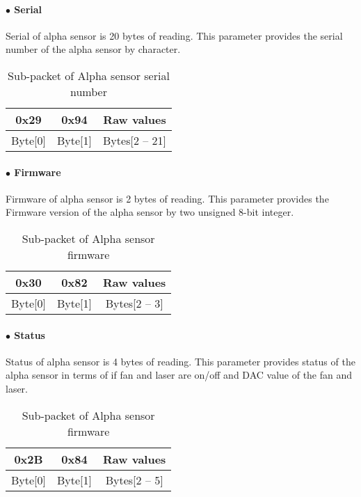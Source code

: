 \paragraph{$\bullet$ Serial}
Serial of alpha sensor is 20 bytes of reading. This parameter provides the serial number of the alpha sensor by character.\\


\begin{table}[h!]
    \centering
    \caption{Sub-packet of Alpha sensor serial number}
    \begin{tabular}{|c|c|c|}
        \hline
        \rowcolor{black!8}
        \textbf{0x29} & \textbf{0x94} & \textbf{Raw values}\\
        \hline
        Byte[0] & Byte[1] & Bytes[2 -- 21] \\ \hline
    \end{tabular}
\end{table}


\paragraph{$\bullet$ Firmware}
Firmware of alpha sensor is 2 bytes of reading. This parameter provides the Firmware version of the alpha sensor by two unsigned 8-bit integer.\\


\begin{table}[h!]
    \centering
    \caption{Sub-packet of Alpha sensor firmware}
    \begin{tabular}{|c|c|c|}
        \hline
        \rowcolor{black!8}
        \textbf{0x30} & \textbf{0x82} & \textbf{Raw values}\\
        \hline
        Byte[0] & Byte[1] & Bytes[2 -- 3] \\ \hline
    \end{tabular}
\end{table}

\paragraph{$\bullet$ Status}
Status of alpha sensor is 4 bytes of reading. This parameter provides status of the alpha sensor in terms of if fan and laser are on/off and DAC value of the fan and laser.\\

\begin{table}[h!]
    \centering
    \caption{Sub-packet of Alpha sensor firmware}
    \begin{tabular}{|c|c|c|}
        \hline
        \rowcolor{black!8}
        \textbf{0x2B} & \textbf{0x84} & \textbf{Raw values}\\
        \hline
        Byte[0] & Byte[1] & Bytes[2 -- 5] \\ \hline
    \end{tabular}
\end{table}



